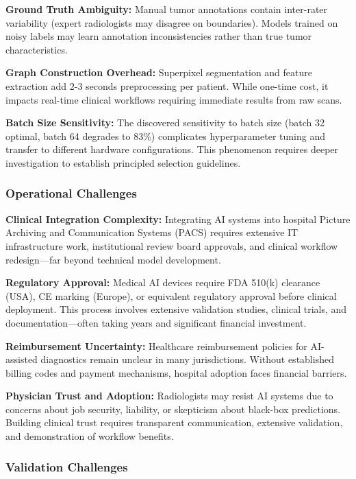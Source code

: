 \textbf{Ground Truth Ambiguity:} Manual tumor annotations contain inter-rater variability (expert radiologists may disagree on boundaries). Models trained on noisy labels may learn annotation inconsistencies rather than true tumor characteristics.

\textbf{Graph Construction Overhead:} Superpixel segmentation and feature extraction add 2-3 seconds preprocessing per patient. While one-time cost, it impacts real-time clinical workflows requiring immediate results from raw scans.

\textbf{Batch Size Sensitivity:} The discovered sensitivity to batch size (batch 32 optimal, batch 64 degrades to 83\%) complicates hyperparameter tuning and transfer to different hardware configurations. This phenomenon requires deeper investigation to establish principled selection guidelines.

\subsubsection{Operational Challenges}

\textbf{Clinical Integration Complexity:} Integrating AI systems into hospital Picture Archiving and Communication Systems (PACS) requires extensive IT infrastructure work, institutional review board approvals, and clinical workflow redesign—far beyond technical model development.

\textbf{Regulatory Approval:} Medical AI devices require FDA 510(k) clearance (USA), CE marking (Europe), or equivalent regulatory approval before clinical deployment. This process involves extensive validation studies, clinical trials, and documentation—often taking years and significant financial investment.

\textbf{Reimbursement Uncertainty:} Healthcare reimbursement policies for AI-assisted diagnostics remain unclear in many jurisdictions. Without established billing codes and payment mechanisms, hospital adoption faces financial barriers.

\textbf{Physician Trust and Adoption:} Radiologists may resist AI systems due to concerns about job security, liability, or skepticism about black-box predictions. Building clinical trust requires transparent communication, extensive validation, and demonstration of workflow benefits.

\subsubsection{Validation Challenges}

